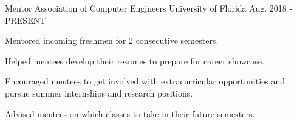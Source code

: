 \begin{cventries}
\cventry
{Mentor} %
{Association of Computer Engineers} %
{University of Florida} %
{Aug. 2018 - PRESENT} %
{ %
\begin{cvitems}
\setlength{\itemindent}{.125in}
\item {Mentored incoming freshmen for 2 consecutive semesters.}
\item {Helped mentees develop their resumes to prepare for career showcase.}
\item {Encouraged mentees to get involved with extracurricular opportunities and pursue summer internships and research positions.}
\item {Advised mentees on which classes to take in their future semesters.}
\end{cvitems}
}



\end{cventries}